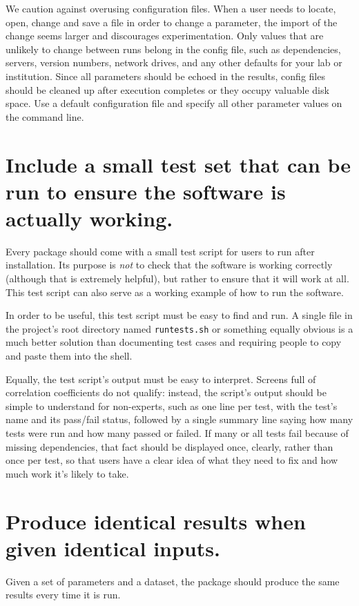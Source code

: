 \documentclass[10pt,letterpaper]{article}
\begin{document}
We caution against overusing configuration files. When a user needs to
locate, open, change and save a file in order to change a parameter, the
import of the change seems larger and discourages experimentation. 
Only values that are unlikely to
change between runs belong in the config file, such as dependencies,
servers, version numbers, network drives, and any other defaults for
your lab or institution. 
Since
all parameters should be echoed in the results, config files should be
cleaned up after execution completes or they occupy valuable disk space.
Use a default configuration file and specify all other parameter values on the
command line.

\section{Include a small test set that can be run to ensure the software is actually working.}

Every package should come with a small test script for users to run
after installation. Its purpose is \emph{not} to check that the software
is working correctly (although that is extremely helpful), but rather to
ensure that it will work at all. This test script can also serve as a
working example of how to run the software.

In order to be useful, this test script must be easy to find and run. A
single file in the project's root directory named \texttt{runtests.sh}
or something equally obvious is a much better solution than documenting
test cases and requiring people to copy and paste them into the shell.

Equally, the test script's output must be easy to interpret. Screens
full of correlation coefficients do not qualify: instead, the script's
output should be simple to understand for non-experts,
such as one line per test, with the test's name
and its pass/fail status, followed by a single summary line saying how
many tests were run and how many passed or failed. If many or all tests
fail because of missing dependencies, that fact should be displayed
once, clearly, rather than once per test, so that users have a clear
idea of what they need to fix and how much work it's likely to take.

\section{Produce identical results when given identical inputs.}

Given a set of parameters and a dataset, the package should produce the
same results every time it is run.
\end{document}
